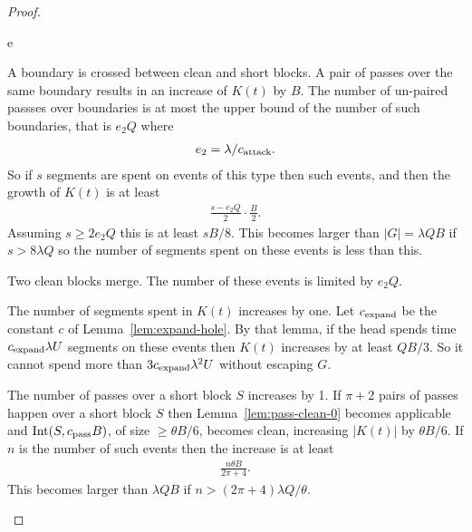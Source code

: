 \documentclass[11pt]{memoir}
\theoremstyle{definition} %
\renewcommand{\ge}{\geq}
\def\B{B}
\def\U{U}
\newcommand{\Int}{\mathrm{Int}}
\newcommand{\passno}{\pi}
\newcommand{\Q}{Q}
\newcommand{\cns}[1]{c_{\textrm{\upshape #1}}}
\newcommand{\CAtt}{\cns{attack}}
\newcommand{\CPass}{\cns{pass}}
\begin{document}
\begin{proof}
  \begin{varenum}{e}

  \item\label{i:cross} A boundary is crossed between clean and short blocks.
    A pair of passes over the same boundary results in an increase of \( K(t) \) by \( \B \).
    The number of un-paired passses over boundaries is at most the upper bound of the number of
    such boundaries, that is \( e_{2}\Q \) where
    \begin{align*}
      e_{2} = \lambda/\CAtt.
 \end{align*}
    So if \( s \) segments are spent on events of this type then 
    such events, and then the growth of \( K(t) \) is at least
    \begin{align*}
      \frac{s - e_{2}\Q}{2}\cdot\frac{\B}{2}.
    \end{align*}
    Assuming \( s\ge 2 e_{2}\Q \) this is at least \( s\B/8 \).
    This becomes larger than \( |G|=\lambda\Q\B \) if \( s>8\lambda\Q \)
    so the number of segments spent on these events is less than this.

  \item\label{i:merge} Two clean blocks merge.
    The number of these events is limited by \( e_{2}\Q \).
    
  \item\label{i:cum-incr} The number of segments spent in \( K(t) \) increases by one.
    Let \( \cns{expand} \) be the constant \( c \) of Lemma~\ref{lem:expand-hole}.
    By that lemma, if the head spends time \( \cns{expand}\lambda\U \) segments
    on these events then \( K(t) \) increases by at least \( \Q\B/3 \).
    So it cannot spend more than \( 3\cns{expand}\lambda^{2}\U \) without escaping \( G \).    
    
  \item\label{i:passes} The number of passes over a short block \( S  \) increases by 1.
    If \( \passno+2 \) pairs of passes happen over a short block \( S \)
    then Lemma~\ref{lem:pass-clean-0} becomes
    applicable and \( \Int(S,\CPass\B) \), of size \( \ge \theta\B/6 \), becomes clean,
    increasing \( |K(t)| \) by \( \theta\B/6 \).
    If \( n \) is the number of such events then the increase is at least
    \begin{align*}
   \frac{n\theta\B}{2\passno+4}.
    \end{align*}
    This becomes larger than \( \lambda\Q\B \) if \( n>(2\passno+4)\lambda\Q/\theta \).
  \end{varenum}
\end{proof}
\end{document}
